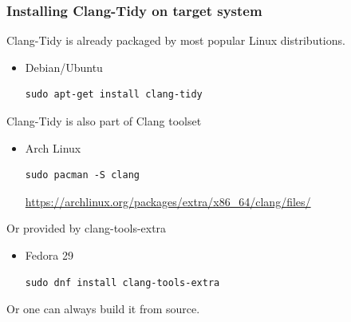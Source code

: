 \documentclass[aspectratio=169]{beamer}
\begin{document}
\begin{frame}[fragile]
\frametitle{Installing Clang-Tidy on target system}
  Clang-Tidy is already packaged by most popular Linux distributions.
  \begin{itemize}
    \item{} Debian/Ubuntu
    {\fontsize{8}{6} \begin{lstlisting}[showstringspaces=false]
sudo apt-get install clang-tidy
    \end{lstlisting}}
  \end{itemize}
  \vspace*{6pt}

  Clang-Tidy is also part of Clang toolset
  \begin{itemize}
    \item{} Arch Linux
    {\fontsize{8}{6} \begin{lstlisting}[showstringspaces=false]
sudo pacman -S clang
    \end{lstlisting}}
      {\fontsize{8}{6} \url{https://archlinux.org/packages/extra/x86_64/clang/files/}}
  \end{itemize}
  \vspace*{6pt}

  Or provided by clang-tools-extra
  \begin{itemize}
    \item{} Fedora 29
    {\fontsize{8}{6} \begin{lstlisting}[showstringspaces=false]
sudo dnf install clang-tools-extra
    \end{lstlisting}}
  \end{itemize}
  \vspace*{6pt}

  Or one can always build it from source.
\end{frame}
\end{document}
